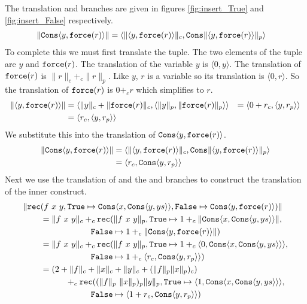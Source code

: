 The translation  and  branches are given in figures
\ref{fig:insert_True} and \ref{fig:insert_False} respectively.
%
\begin{align*}
  \|\texttt{Cons}\langle y,\texttt{force}(r)\rangle\| &= \langle \|\langle y,\texttt{force}(r)\rangle\|_c, \texttt{Cons}\|\langle y,\texttt{force}(r)\rangle\|_p\rangle
\end{align*}
%
To complete this we must first translate the tuple. The two elements of the
tuple are $y$ and $\texttt{force}(r)$.  The translation of the variable $y$ is
$\langle 0, y\rangle$. The translation of $\texttt{force}(r)$ is
$\|r\|_c +_c \|r\|_p$. Like $y$, $r$ is a variable so its translation is
$\langle 0,r\rangle$. So the translation of $\texttt{force}(r)$ is $0 +_c r$ which
simplifies to $r$.
%
\begin{align*}
  \|\langle y,\texttt{force}(r)\rangle\| &= \langle \|y\|_c + \|\texttt{force}(r)\|_c, \langle\|y\|_p,\|\texttt{force}(r)\|_p\rangle\rangle
                                    &= \langle 0 + r_c, \langle y,r_p\rangle\rangle \\
                                    &= \langle r_c, \langle y,r_p\rangle\rangle
\end{align*}
%
We substitute this into the translation of $\texttt{Cons}\langle y,\texttt{force}(r)\rangle$.
%
\begin{align*}
  \|\texttt{Cons}\langle y,\texttt{force}(r)\rangle\| &= \langle \|\langle y,\texttt{force}(r)\rangle\|_c, \texttt{Cons}\|\langle y,\texttt{force}(r)\rangle\|_p\rangle \\
                                            &= \langle r_c, \texttt{Cons}\langle y,r_p\rangle\rangle
\end{align*}
%
%
%
Next we use the translation of  and the  and 
branches to construct the translation of the inner  construct.
%
\begin{align*}
  \|\texttt{rec}&(f\ x\ y, \texttt{True}\mapsto\texttt{Cons}\langle x,\texttt{Cons}\langle y,ys\rangle\rangle, \texttt{False}\mapsto \texttt{Cons}\langle y,\texttt{force}(r)\rangle)\| \\
           &= \|f\ x\ y\|_c +_c \texttt{rec}(\|f\ x\ y\|_p, \texttt{True}\mapsto 1 +_c \|\texttt{Cons}\langle x,\texttt{Cons}\langle y,ys\rangle\rangle\|, \\
           &\qquad\quad\quad\quad\quad \texttt{False}\mapsto 1 +_c \|\texttt{Cons}\langle y,\texttt{force}(r)\rangle\|) \\
           &= \|f\ x\ y\|_c +_c \texttt{rec}(\|f\ x\ y\|_p, \texttt{True}\mapsto 1 +_c \langle 0, \texttt{Cons}\langle x,\texttt{Cons}\langle y,ys\rangle\rangle\rangle, \\
           &\qquad\quad\quad\quad\quad \texttt{False}\mapsto 1 +_c \langle r_c, \texttt{Cons}\langle y,r_p\rangle\rangle) \\
           &= (2 + \|f\|_c + \|x\|_c + \|y\|_c + (\|f\|_p \|x\|_p)_c) \\
           &\qquad\quad +_c \texttt{rec}((\|f\|_p\ \|x\|_p)_p \|y\|_p, \texttt{True}\mapsto \langle 1, \texttt{Cons}\langle x,\texttt{Cons}\langle y,ys\rangle\rangle\rangle, \\
           &\qquad\quad\quad\quad\quad \texttt{False}\mapsto \langle 1 + r_c, \texttt{Cons}\langle y,r_p\rangle\rangle) \\
\end{align*}

